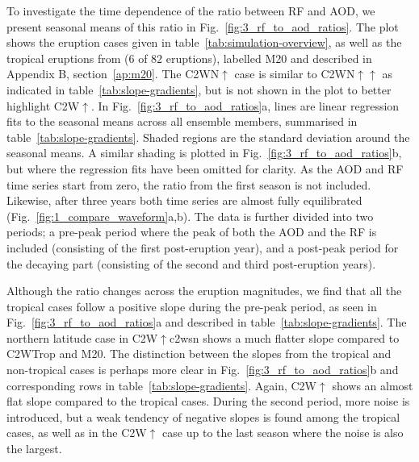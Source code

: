 \documentclass[draft]{agujournal2019}
\newcommand{\cwt}{C2WTrop}
\newcommand{\cws}{C2WN\(\uparrow\)}
\newcommand{\cwss}{C2WN\(\uparrow\uparrow\)}
\newcommand{\cwsn}{C2W\(\uparrow\)}
\begin{document}
To investigate the time dependence of the ratio between RF and AOD, we present seasonal
means of this ratio in Fig.~\ref{fig:3_rf_to_aod_ratios}. The plot shows the eruption
cases given in table~\ref{tab:simulation-overview}, as well as the tropical eruptions
from  (\(6\) of \(82\) eruptions), labelled M20 and described
in Appendix B, section~\ref{ap:m20}. The \cws{} case is similar to \cwss{} as indicated
in table~\ref{tab:slope-gradients}, but is not shown in the plot to better highlight
\cwsn{}. In Fig.~\ref{fig:3_rf_to_aod_ratios}a, lines are linear regression fits to the
seasonal means across all ensemble members, summarised in
table~\ref{tab:slope-gradients}. Shaded regions are the standard deviation around the
seasonal means. A similar shading is plotted in Fig.~\ref{fig:3_rf_to_aod_ratios}b, but
where the regression fits have been omitted for clarity. As the AOD and RF time series
start from zero, the ratio from the first season is not included. Likewise, after three
years both time series are almost fully equilibrated
(Fig.~\ref{fig:1_compare_waveform}a,b). The data is further divided into two periods; a
pre-peak period where the peak of both the AOD and the RF is included (consisting of the
first post-eruption year), and a post-peak period for the decaying part (consisting of
the second and third post-eruption years).

Although the ratio changes across the eruption magnitudes, we find that all the tropical
cases follow a positive slope during the pre-peak period, as seen in
Fig.~\ref{fig:3_rf_to_aod_ratios}a and described in table~\ref{tab:slope-gradients}. The
northern latitude case in \cwsn{c2wsn} shows a much flatter slope compared to \cwt{} and
M20. The distinction between the slopes from the tropical and non-tropical cases is
perhaps more clear in Fig.~\ref{fig:3_rf_to_aod_ratios}b and corresponding rows in
table~\ref{tab:slope-gradients}. Again, \cwsn{} shows an almost flat slope compared to
the tropical cases. During the second period, more noise is introduced, but a weak
tendency of negative slopes is found among the tropical cases, as well as in the \cwsn{}
case up to the last season where the noise is also the largest.
\end{document}
